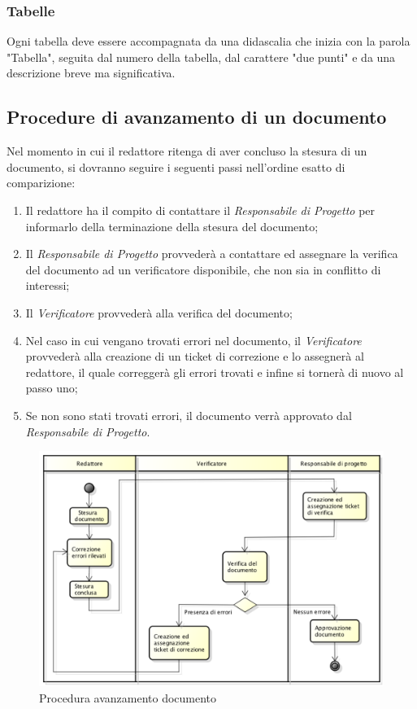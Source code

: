 \subsubsection{Tabelle}
Ogni tabella deve essere accompagnata da una didascalia che inizia con la parola "Tabella", seguita dal numero della tabella, dal carattere "due punti" e da una  descrizione breve ma significativa.

\subsection{Procedure di avanzamento di un documento}
Nel momento in cui il redattore ritenga di aver concluso la stesura di un documento, si dovranno seguire i seguenti passi nell'ordine esatto di comparizione:
\begin{enumerate}
	\item Il redattore ha il compito di contattare il \textit{Responsabile di Progetto} per informarlo della terminazione della stesura del documento;
	\item Il \textit{Responsabile di Progetto} provvederà a contattare ed assegnare la verifica del documento ad un verificatore disponibile, che non sia in conflitto di interessi;
	\item Il \textit{Verificatore} provvederà alla  verifica del documento;
	\item Nel caso in cui vengano trovati errori nel documento, il \textit{Verificatore} provvederà alla creazione di un ticket di correzione e lo assegnerà al redattore, il quale correggerà gli errori trovati e infine si tornerà di nuovo al passo uno;
	\item Se non sono stati trovati errori, il documento verrà approvato dal \textit{Responsabile di Progetto}. 
\end{enumerate}
\begin{figure}[h]
\centering
\includegraphics[width=0.9\linewidth]{img/proceduraDocumenti}
\caption[Procedura avanzamento documento]{Procedura avanzamento documento}
\label{fig:proceduraDocumenti}
\end{figure}




